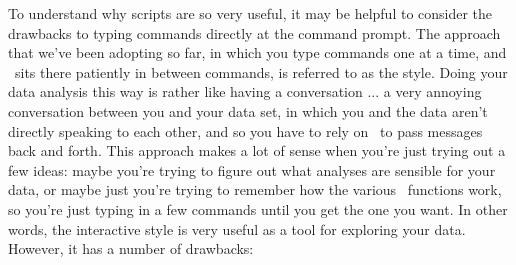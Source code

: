 To understand why scripts are so very useful, it may be helpful to consider the drawbacks to typing commands directly at the command prompt. The approach that we've been adopting so far, in which you type commands one at a time, and \R\ sits there patiently in between commands, is referred to as the  style. Doing your data analysis this way is rather like having a conversation ... a very annoying conversation between you and your data set, in which you and the data aren't directly speaking to each other, and so you have to rely on \R\ to pass messages back and forth. This approach makes a lot of sense when you're just trying out a few ideas: maybe you're trying to figure out what analyses are sensible for your data, or maybe just you're trying to remember how the various \R\ functions work, so you're just typing in a few commands until you get the one you want. In other words, the interactive style is very useful as a tool for exploring your data. However, it has a number of drawbacks:

